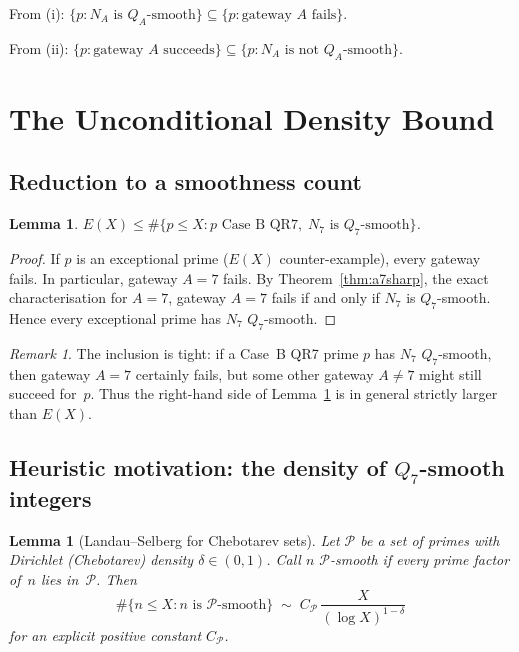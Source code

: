 \documentclass[12pt]{amsart}
\newtheorem{lemma}[theorem]{Lemma}
\theoremstyle{definition}
\theoremstyle{remark}
\newtheorem{remark}[theorem]{Remark}
\begin{document}
From (i): $\{p : N_A \text{ is } Q_A\text{-smooth}\}
          \subseteq \{p : \text{gateway } A \text{ fails}\}$.

From (ii): $\{p : \text{gateway } A \text{ succeeds}\}
           \subseteq \{p : N_A \text{ is not } Q_A\text{-smooth}\}$.

\section{The Unconditional Density Bound}\label{sec:bound}

\subsection{Reduction to a smoothness count}

\begin{lemma}\label{lem:contain}
$E(X) \le \#\{p \le X : p \text{ Case~B QR7},\; N_7 \text{ is } Q_7\text{-smooth}\}$.
\end{lemma}

\begin{proof}
If $p$ is an exceptional prime ($E(X)$ counter-example), every gateway fails.
In particular, gateway $A=7$ fails.
By Theorem~\ref{thm:a7sharp}, the exact characterisation for $A=7$,
gateway $A=7$ fails if and only if $N_7$ is $Q_7$-smooth.
Hence every exceptional prime has $N_7$ $Q_7$-smooth.
\end{proof}

\begin{remark}
The inclusion is tight: if a Case~B QR7 prime $p$ has $N_7$ $Q_7$-smooth,
then gateway $A=7$ certainly fails, but some other gateway $A \ne 7$
might still succeed for~$p$.  Thus the right-hand side of
Lemma~\ref{lem:contain} is in general strictly larger than $E(X)$.
\end{remark}

\subsection{Heuristic motivation: the density of $Q_7$-smooth integers}

\begin{lemma}[Landau--Selberg for Chebotarev sets]\label{lem:qa-density}
Let $\mathcal{P}$ be a set of primes with Dirichlet (Chebotarev) density
$\delta \in (0,1)$.  Call $n$ \emph{$\mathcal{P}$-smooth} if every prime
factor of~$n$ lies in~$\mathcal{P}$.  Then
\[
  \#\{n \le X : n \text{ is } \mathcal{P}\text{-smooth}\}
  \;\sim\; C_{\mathcal{P}}\,\frac{X}{(\log X)^{1-\delta}}
\]
for an explicit positive constant $C_{\mathcal{P}}$.
\end{lemma}
\end{document}
